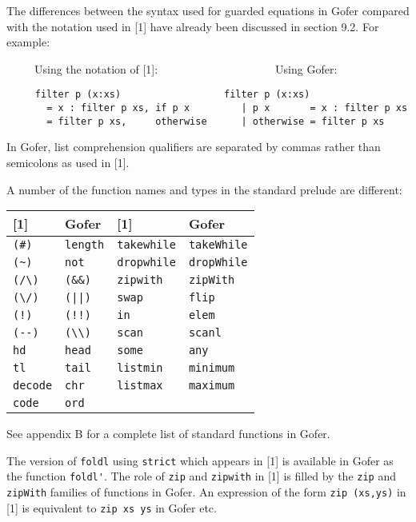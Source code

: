 \IT  The differences between the syntax used for  guarded equations  in
     Gofer compared with the notation used in  [1]  have  already  been
     discussed in section 9.2.  For example:

     ~~~~~Using the notation of [1]:~~~~~~~~~~~~~~~~~~~~~Using Gofer:
\begin{verbatim}
     filter p (x:xs)                  filter p (x:xs)
       = x : filter p xs, if p x         | p x       = x : filter p xs
       = filter p xs,     otherwise      | otherwise = filter p xs
\end{verbatim}
\IT  In Gofer,  list comprehension qualifiers  are separated by  commas
     rather than semicolons as used in [1].

\IT  A number of the  function names and types in the  standard prelude
     are different:
\BQ
\begin{tabular}{ll|ll}
  {[1]}          &    Gofer           & {[1]}            &  Gofer \\\hline
  \verb"(#)"     &    \verb"length"   & \verb"takewhile" &  \verb"takeWhile"\\
  \verb"(~)"     &    \verb"not"      & \verb"dropwhile" &  \verb"dropWhile"\\
  \verb"(/\)"    &    \verb"(&&)"     & \verb"zipwith"   &  \verb"zipWith"\\
  \verb"(\/)"    &    \verb"(||)"     & \verb"swap"      &  \verb"flip"\\
  \verb"(!)"     &    \verb"(!!)"     & \verb"in"        &  \verb"elem"\\
  \verb"(--)"    &    \verb"(\\)"     & \verb"scan"      &  \verb"scanl"\\
  \verb"hd"      &    \verb"head"     & \verb"some"      &  \verb"any"\\
  \verb"tl"      &    \verb"tail"     & \verb"listmin"   &  \verb"minimum"\\
  \verb"decode"  &    \verb"chr"      & \verb"listmax"   &  \verb"maximum"\\
  \verb"code"    &    \verb"ord"
\end{tabular}
\EQ
     See appendix B for a complete list of standard functions in Gofer.

     The version of \verb"foldl"  using  \verb"strict"  
     which  appears  in  [1]  is
     available in Gofer as the function \verb"foldl'".
     The role of \verb"zip" and \verb"zipwith" in [1] is 
     filled by the \verb"zip"  and
     \verb"zipWith" families of functions in Gofer.  An  expression  of  the
     form \verb"zip (xs,ys)" in [1] is equivalent to 
     \verb"zip xs ys"  in  Gofer
     etc.

